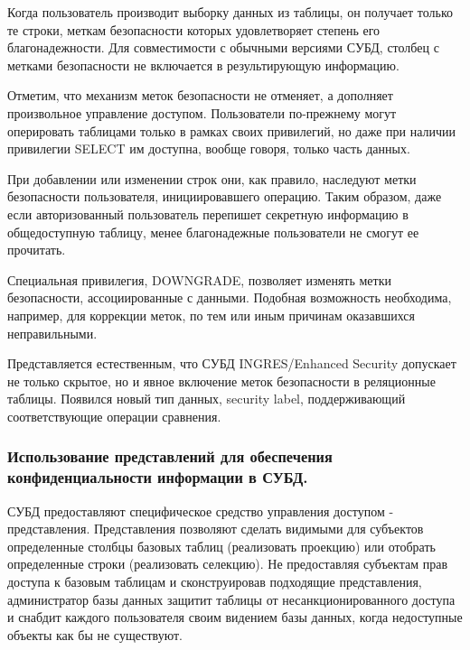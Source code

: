 Когда пользователь производит выборку данных из таблицы, он получает только те строки, меткам безопасности которых удовлетворяет степень его благонадежности. Для совместимости с обычными версиями СУБД, столбец с метками безопасности не включается в результирующую информацию.

Отметим, что механизм меток безопасности не отменяет, а дополняет произвольное управление доступом. Пользователи по-прежнему могут оперировать таблицами только в рамках своих привилегий, но даже при наличии привилегии SELECT им доступна, вообще говоря, только часть данных.

При добавлении или изменении строк они, как правило, наследуют метки безопасности пользователя, инициировавшего операцию. Таким образом, даже если авторизованный пользователь перепишет секретную информацию в общедоступную таблицу, менее благонадежные пользователи не смогут ее прочитать.

Специальная привилегия, DOWNGRADE, позволяет изменять метки безопасности, ассоциированные с данными. Подобная возможность необходима, например, для коррекции меток, по тем или иным причинам оказавшихся неправильными.

Представляется естественным, что СУБД INGRES/Enhanced Security допускает не только скрытое, но и явное включение меток безопасности в реляционные таблицы. Появился новый тип данных, security label, поддерживающий соответствующие операции сравнения.

\subsubsection{Использование представлений для обеспечения конфиденциальности
информации в СУБД.}

СУБД предоставляют специфическое средство управления доступом - представления. Представления позволяют сделать видимыми для субъектов определенные столбцы базовых таблиц (реализовать проекцию) или отобрать определенные строки (реализовать селекцию). Не предоставляя субъектам прав доступа к базовым таблицам и сконструировав подходящие представления, администратор базы данных защитит таблицы от несанкционированного доступа и снабдит каждого пользователя своим видением базы данных, когда недоступные объекты как бы не существуют.

